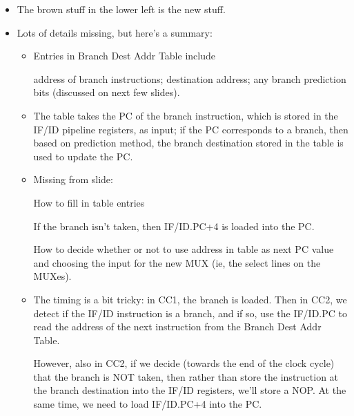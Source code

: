 \begin{frame}[fragile]
\BNotes\ifnum{}
\begin{itemize}
\item The brown stuff in the lower left is the new stuff.
\item Lots of details missing, but here's a summary:
  \begin{itemize}
  \item Entries in Branch Dest Addr Table include

    address of branch instructions;
    destination address; any branch prediction bits
    (discussed on next few slides).
    
  \item The table takes the PC of the branch instruction, which is stored in the IF/ID pipeline registers, as input; if the PC corresponds to a branch,
    then based on prediction method, the branch destination stored in the
    table is used to update the PC.
  \item Missing from slide:

    How to fill in table entries

    If the branch isn't taken, then IF/ID.PC+4 is loaded into the PC.

    How to decide whether or not to use address in table as next PC value
    and choosing the input for the new MUX (ie, the select lines on the MUXes).
    \item The timing is a bit tricky: in CC1, the branch is loaded.
	    Then in CC2, we detect if the IF/ID instruction is a branch, and if
		  so, use the IF/ID.PC to read the address of the next
		  instruction from the Branch Dest Addr Table.

		  However, also in CC2, if we decide (towards the end of the
		  clock cycle) that the branch is NOT taken, then rather than
		  store the instruction at the branch destination into the
		  IF/ID registers, we'll store a NOP.  At the same time,
		  we need to load IF/ID.PC+4 into the PC.


  \end{itemize}
\end{itemize}
\fi\ENotes
\end{frame}

